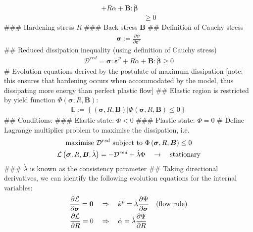 \documentclass[]{scrartcl}
\begin{document}
\begin{easylist}[itemize]
\begin{align*}
  + R \dot{\alpha}
  + \boldsymbol{B} : \dot{\boldsymbol{\beta}}
  \\
  &\geq 0
\end{align*}
### Hardening stress $R$
### Back stress $\boldsymbol{B}$
## Definition of Cauchy stress
\begin{gather}
\boldsymbol{\sigma} 
  := \frac{\partial \psi}{\partial \boldsymbol{\varepsilon}^{e}}
\end{gather}
## Reduced dissipation inequality (using definition of Cauchy stress)
\begin{gather*}
\mathcal{D}^{red}
  = \boldsymbol{\sigma} : \dot{\boldsymbol{\varepsilon}}^{p}
  + R \dot{\alpha}
  + \boldsymbol{B} : \dot{\boldsymbol{\beta}}
  \geq 0
\end{gather*}
# Evolution equations derived by the postulate of maximum dissipation [note: this ensures that hardening occurs when accommodated by the model, thus dissipating more energy than perfect plastic flow]
## Elastic region is restricted by yield function $\Phi \left( \boldsymbol{\sigma},R,\boldsymbol{B} \right)$:
\begin{gather}
\mathbb{E} := \left\lbrace \left( \boldsymbol{\sigma},R,\boldsymbol{B} \right) \vert \Phi \left( \boldsymbol{\sigma},R,\boldsymbol{B} \right) \leq 0 \right\rbrace
\end{gather}
## Conditions:
### Elastic state: $\Phi < 0$
### Plastic state: $\Phi = 0$
# Define Lagrange multiplier problem to maximise the dissipation, i.e.
\begin{gather*}
\textnormal{maximise } \mathcal{D}^{red} \textnormal{ subject to } \Phi \left( \boldsymbol{\sigma},R,\boldsymbol{B} \right) \leq 0 \\
\mathcal{L} \left( \boldsymbol{\sigma},R,\boldsymbol{B}, \dot{\lambda} \right)
  = -\mathcal{D}^{red} + \dot{\lambda} \Phi 
  \quad \rightarrow \quad \textnormal{stationary}
\end{gather*}
### $\dot{\lambda}$ is known as the consistency parameter
## Taking directional derivatives, we can identify the following evolution equations for the internal variables:
\begin{align*}
\frac{\partial \mathcal{L}}{\partial \boldsymbol{\sigma}} = \boldsymbol{0}
\quad &\Rightarrow \quad 
\dot{\boldsymbol{\varepsilon}}^{p} = \dot{\lambda} \frac{\partial \Psi}{\partial \boldsymbol{\sigma}}
\quad \textnormal{(flow rule)}
\\
\frac{\partial \mathcal{L}}{\partial R} = 0
\quad &\Rightarrow \quad 
\dot{\alpha} = \dot{\lambda} \frac{\partial \Psi}{\partial R}

\end{align*}
\end{easylist}
\end{document}

